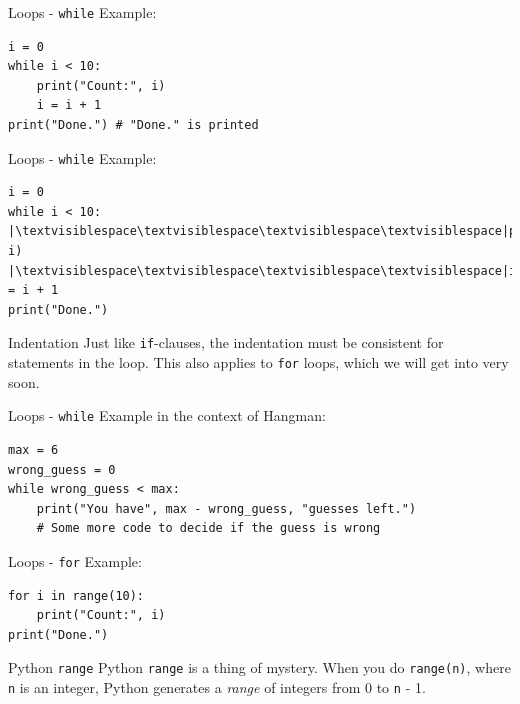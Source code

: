 \documentclass[dvipsnames, svgnames, x11names]{beamer}
\begin{document}
\addtocounter{framenumber}{-1}

\begin{frame}[fragile]{Loops - \texttt{while}}
Example:
\begin{verbatim}
i = 0
while i < 10:
    print("Count:", i)
    i = i + 1
print("Done.") # "Done." is printed
\end{verbatim}
\end{frame}

\begin{frame}[fragile]{Loops - \texttt{while}}
Example:
\begin{verbatim}
i = 0
while i < 10:
|\textvisiblespace\textvisiblespace\textvisiblespace\textvisiblespace|print("Count:", i)
|\textvisiblespace\textvisiblespace\textvisiblespace\textvisiblespace|i = i + 1
print("Done.")
\end{verbatim}
\begin{block}{Indentation}
Just like \texttt{if}-clauses, the indentation must be consistent for statements in the loop.
This also applies to \texttt{for} loops, which we will get into very soon.
\end{block}
\end{frame}

\begin{frame}[fragile]{Loops - \texttt{while}}
Example in the context of Hangman:
\begin{verbatim}
max = 6
wrong_guess = 0
while wrong_guess < max:
    print("You have", max - wrong_guess, "guesses left.")
    # Some more code to decide if the guess is wrong
\end{verbatim}
\end{frame}

\begin{frame}[fragile]{Loops - \texttt{for}}
Example:
\begin{verbatim}
for i in range(10):
    print("Count:", i)
print("Done.")
\end{verbatim}
\begin{block}{Python \texttt{range}}
Python \texttt{range} is a thing of mystery. When you do \texttt{range(n)}, where \texttt{n} is an integer, Python generates a \textit{range} of integers from 0 to \texttt{n} - 1.
\end{block}
\end{frame}
\end{document}
